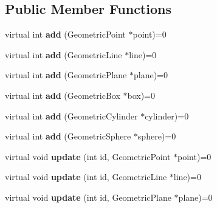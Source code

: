 \subsection*{Public Member Functions}
\begin{DoxyCompactItemize}
\item 
\hypertarget{classhiqp_1_1Visualizer_a3408ea152dad3f1e84ea10f6dcf1ddfa}{virtual int {\bfseries add} (Geometric\-Point $\ast$point)=0}\label{classhiqp_1_1Visualizer_a3408ea152dad3f1e84ea10f6dcf1ddfa}

\item 
\hypertarget{classhiqp_1_1Visualizer_a006996d7fe4fa5da95f5fe8a5ffe4b49}{virtual int {\bfseries add} (Geometric\-Line $\ast$line)=0}\label{classhiqp_1_1Visualizer_a006996d7fe4fa5da95f5fe8a5ffe4b49}

\item 
\hypertarget{classhiqp_1_1Visualizer_ab04339fd46f98e6dac9786437bbd453e}{virtual int {\bfseries add} (Geometric\-Plane $\ast$plane)=0}\label{classhiqp_1_1Visualizer_ab04339fd46f98e6dac9786437bbd453e}

\item 
\hypertarget{classhiqp_1_1Visualizer_ada64cd2f429aa3da7b5efde5a74c5032}{virtual int {\bfseries add} (Geometric\-Box $\ast$box)=0}\label{classhiqp_1_1Visualizer_ada64cd2f429aa3da7b5efde5a74c5032}

\item 
\hypertarget{classhiqp_1_1Visualizer_af50a44f684fe1d56401489715f555ed6}{virtual int {\bfseries add} (Geometric\-Cylinder $\ast$cylinder)=0}\label{classhiqp_1_1Visualizer_af50a44f684fe1d56401489715f555ed6}

\item 
\hypertarget{classhiqp_1_1Visualizer_ab4f23d245fbd7b525bedaf4b94ea4d66}{virtual int {\bfseries add} (Geometric\-Sphere $\ast$sphere)=0}\label{classhiqp_1_1Visualizer_ab4f23d245fbd7b525bedaf4b94ea4d66}

\item 
\hypertarget{classhiqp_1_1Visualizer_a0cc4b3f0e99fc3ece0f895ae83ed272a}{virtual void {\bfseries update} (int id, Geometric\-Point $\ast$point)=0}\label{classhiqp_1_1Visualizer_a0cc4b3f0e99fc3ece0f895ae83ed272a}

\item 
\hypertarget{classhiqp_1_1Visualizer_ab4b295c193b298306b6746cd2be28f77}{virtual void {\bfseries update} (int id, Geometric\-Line $\ast$line)=0}\label{classhiqp_1_1Visualizer_ab4b295c193b298306b6746cd2be28f77}

\item 
\hypertarget{classhiqp_1_1Visualizer_aad1fd45a3e14dbabe58778a8697022b6}{virtual void {\bfseries update} (int id, Geometric\-Plane $\ast$plane)=0}\label{classhiqp_1_1Visualizer_aad1fd45a3e14dbabe58778a8697022b6}


\end{DoxyCompactItemize}
